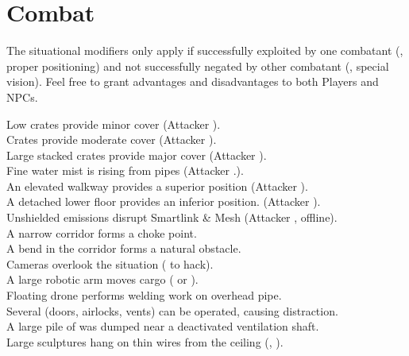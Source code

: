 \documentclass[a4]{article}
\begin{document}
\section{Combat}

The situational modifiers only apply if successfully exploited by
one combatant (\eg, proper positioning) and not successfully negated
by other combatant (\eg, special vision).
%
Feel free to grant advantages and disadvantages to both Players and NPCs.

\starttableone
Low crates provide minor cover (Attacker ).\\
Crates provide moderate cover (Attacker ).\\
Large stacked crates provide major cover (Attacker ).\\
Fine water mist is rising from pipes (Attacker .).\\
An elevated walkway provides a superior position (Attacker ).\\
A detached lower floor provides an inferior position. (Attacker ).\\
Unshielded emissions disrupt Smartlink \& Mesh (Attacker , offline).\\
A narrow corridor forms a choke point.\\
A bend in the corridor forms a natural obstacle.\\

Cameras overlook the situation ( to hack).\\
A large robotic arm moves cargo ( or ).\\
Floating drone performs welding work on overhead pipe.\\
Several (doors, airlocks, vents) can be operated, causing distraction.\\
A large pile of  was dumped near a deactivated ventilation shaft.\\

Large sculptures hang on thin wires from the ceiling (, ).\\

\stoptableone
\end{document}
